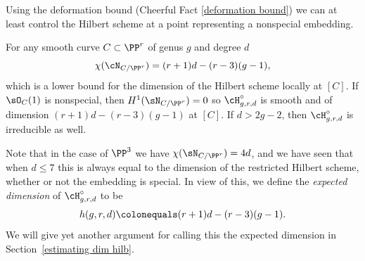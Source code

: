 Using the
%
deformation bound
(Cheerful Fact \ref{deformation bound}) we can at least
control the Hilbert scheme at
a point representing a nonspecial embedding.

\begin{theorem}\label{nonspecial Hilbert}
For any smooth curve $C\subset \PP^{r}$ of genus $g$ and degree $d$
$$
\chi(\cN_{C/\PP^{r}}) = (r+1)d - (r-3)(g-1),
$$
which is a lower bound for the dimension of the Hilbert scheme locally
at $[C]$.
If $\sO_{C}(1)$ is nonspecial,
 then $H^1(\sN_{C/\PP^r})=0$ so
 $\cH^\circ_{g,r,d}$ is smooth and of dimension $ (r+1)d - (r-3)(g-1)$
 at $[C]$.
 If $d>2g-2$,
then $\cH^\circ_{g,r,d}$ is irreducible as well.
\end{theorem}

Note that in the case of $\PP^3$ we have $\chi(\sN_{C/\PP^r}) = 4d$,
and we have
seen that when $d\leq 7$ this is always equal to the dimension of the
restricted Hilbert
scheme, whether or not the embedding is special. In view of this,
we define the \emph{expected dimension} of $\cH^\circ_{g,r,d}$ to be
$$
h(g,r,d) \colonequals  (r+1)d - (r-3)(g-1).
$$
We will give yet another argument for calling this the expected dimension
in Section~\ref{estimating dim hilb}.

